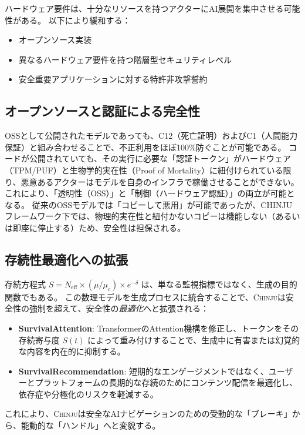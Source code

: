 \documentclass[11pt,a4paper]{article}
\newcommand{\chinju}{\textsc{Chinju}}
\newcommand{\Neff}{N_{\text{eff}}}
\newcommand{\muc}{\mu_c}
\begin{document}
ハードウェア要件は、十分なリソースを持つアクターにAI展開を集中させる可能性がある。
以下により緩和する：
\begin{itemize}
    \item オープンソース実装
    \item 異なるハードウェア要件を持つ階層型セキュリティレベル
    \item 安全重要アプリケーションに対する特許非攻撃誓約
\end{itemize}

\subsection{オープンソースと認証による完全性}
OSSとして公開されたモデルであっても、C12（死亡証明）およびC1（人間能力保証）と組み合わせることで、不正利用をほぼ100\%防ぐことが可能である。
コードが公開されていても、その実行に必要な「認証トークン」がハードウェア（TPM/PUF）と生物学的実在性（Proof of Mortality）に紐付けられている限り、悪意あるアクターはモデルを自身のインフラで稼働させることができない。
これにより、「透明性（OSS）」と「制御（ハードウェア認証）」の両立が可能となる。
従来のOSSモデルでは「コピーして悪用」が可能であったが、CHINJUフレームワーク下では、物理的実在性と紐付かないコピーは機能しない（あるいは即座に停止する）ため、安全性は担保される。

\subsection{存続性最適化への拡張}
存続方程式 $S = \Neff \times (\mu/\muc) \times e^{-\delta}$ は、単なる監視指標ではなく、生成の目的関数でもある。
この数理モデルを生成プロセスに統合することで、\chinju{}は安全性の強制を超えて、安全性の\emph{最適化}へと拡張される：
\begin{itemize}
    \item \textbf{SurvivalAttention}: TransformerのAttention機構を修正し、トークンをその存続寄与度 $S(t)$ によって重み付けすることで、生成中に有害または幻覚的な内容を内在的に抑制する。
    \item \textbf{SurvivalRecommendation}: 短期的なエンゲージメントではなく、ユーザーとプラットフォームの長期的な存続のためにコンテンツ配信を最適化し、依存症や分極化のリスクを軽減する。
\end{itemize}
これにより、\chinju{}は安全なAIナビゲーションのための受動的な「ブレーキ」から、能動的な「ハンドル」へと変貌する。
\end{document}
